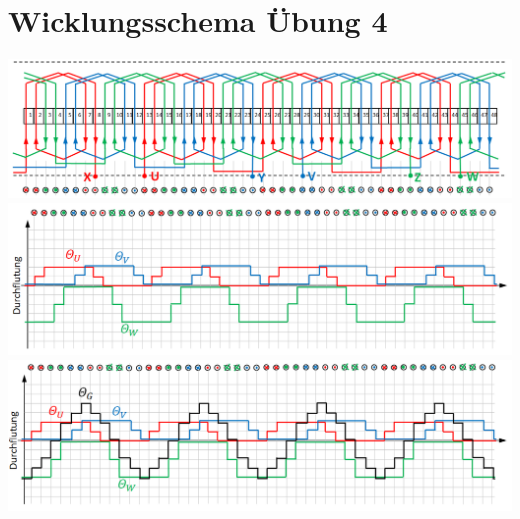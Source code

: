 \section{Wicklungsschema Übung 4}
\begin{center}
    \includegraphics[width = 15cm]{images/Wicklungsschema}\newline
    \includegraphics[width = 15cm]{images/Durchflutung3} \newline
    \includegraphics[width = 15cm]{images/Durchflutung4} \newline
\end{center}
\vspace{-1cm}
